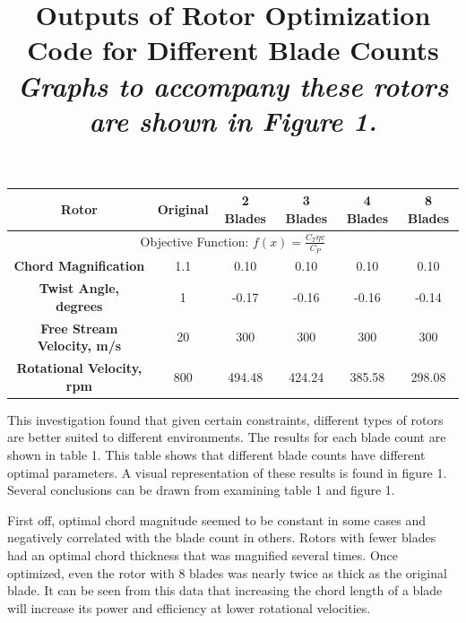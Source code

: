 \documentclass{article}
\begin{document}
\begin{table}[bp]
	\centering
	\title{Outputs of Rotor Optimization Code for Different Blade Counts \newline}
	\title{\emph{Graphs to accompany these rotors are shown in Figure 1.}} \label{table:1} \newline
	\begin{tabular}{| c | c | c | c | c | c |}
		 \hline
		 \textbf{Rotor} & Original & 2 Blades & 3 Blades & 4 Blades & 8 Blades \\ \hline
		 \multicolumn{6}{c|}{Objective Function: $ f(x) = \frac{C_{T} \eta v}{C_{P}} $} \\ \hline
		 \textbf{Chord Magnification} & 1.1 & 0.10 & 0.10 & 0.10 & 0.10 \\ \newline
		 \textbf{Twist Angle, degrees} & 1 & -0.17 & -0.16 & -0.16 & -0.14 \\ \newline
		 \textbf{Free Stream Velocity, m/s} & 20 & 300 & 300 & 300 & 300 \\ \newline
		 \textbf{Rotational Velocity, rpm} & 800 & 494.48 & 424.24 & 385.58 & 298.08 \\ \hline
	\end{tabular}
\end{table}

This investigation found that given certain constraints, different types of rotors are better suited to different environments. The results for each blade count are shown in table 1. This table shows that different blade counts have different optimal parameters. A visual representation of these results is found in figure 1. Several conclusions can be drawn from examining table 1 and figure 1. \newline

First off, optimal chord magnitude seemed to be constant in some cases and negatively correlated with the blade count in others. Rotors with fewer blades had an optimal chord thickness that was magnified several times.  Once optimized, even the rotor with 8 blades was nearly twice as thick as the original blade. It can be seen from this data that increasing the chord length of a blade will increase its power and efficiency at lower rotational velocities. \newline
\end{document}
